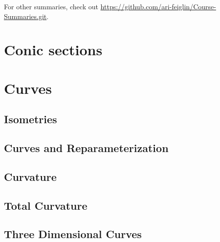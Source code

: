 \documentclass[10pt]{article}
\begin{document}

\bigskip

For other summaries, check out \textcolor{blue}{\url{https://github.com/ari-feiglin/Course-Summaries.git}}.

\tableofcontents

\newpage
\section{Conic sections}



\newpage
\section{Curves}

\subsection{Isometries}



\subsection{Curves and Reparameterization}



\subsection{Curvature}



\subsection{Total Curvature}



\subsection{Three Dimensional Curves}
\end{document}
